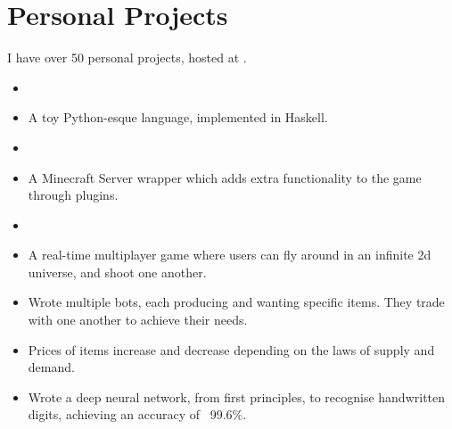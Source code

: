 \documentclass{jcgcv}
\begin{document}
\begin{column}



\section{Personal Projects}

I have over 50 personal projects, hosted at .

\vspace{2pt}

\begin{itemize}
  \item {}
  \item A toy Python-esque language, implemented in Haskell.
\end{itemize}

\begin{itemize}
  \item {}
  \item A Minecraft Server wrapper which adds extra functionality to the game through plugins.
\end{itemize}

\begin{itemize}
  \item {}
  \item A real-time multiplayer game where users can fly around in an infinite 2d universe, and shoot one another.
\end{itemize}

\begin{itemize}
  \item Wrote multiple bots, each producing and wanting specific items. They trade with one another to achieve their needs.
  \item Prices of items increase and decrease depending on the laws of supply and demand.
\end{itemize}

\begin{itemize}
  \item Wrote a deep neural network, from first principles, to recognise handwritten digits, achieving an accuracy of ~99.6\%.
\end{itemize}


\end{column}
\end{document}

